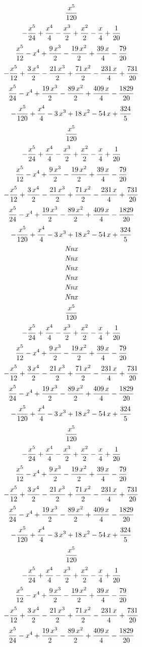 $${{x^5}\over{120}}$$
$$-{{x^5}\over{24}}+{{x^4}\over{4}}-{{x^3}\over{2}}+{{x^2}\over{2}}-
 {{x}\over{4}}+{{1}\over{20}}$$
$${{x^5}\over{12}}-x^4+{{9\,x^3}\over{2}}-{{19\,x^2}\over{2}}+{{39\,x
 }\over{4}}-{{79}\over{20}}$$
$$-{{x^5}\over{12}}+{{3\,x^4}\over{2}}-{{21\,x^3}\over{2}}+{{71\,x^2
 }\over{2}}-{{231\,x}\over{4}}+{{731}\over{20}}$$
$${{x^5}\over{24}}-x^4+{{19\,x^3}\over{2}}-{{89\,x^2}\over{2}}+{{409
 \,x}\over{4}}-{{1829}\over{20}}$$
$$-{{x^5}\over{120}}+{{x^4}\over{4}}-3\,x^3+18\,x^2-54\,x+{{324
 }\over{5}}$$
$${{x^5}\over{120}}$$
$$-{{x^5}\over{24}}+{{x^4}\over{4}}-{{x^3}\over{2}}+{{x^2}\over{2}}-
 {{x}\over{4}}+{{1}\over{20}}$$
$${{x^5}\over{12}}-x^4+{{9\,x^3}\over{2}}-{{19\,x^2}\over{2}}+{{39\,x
 }\over{4}}-{{79}\over{20}}$$
$$-{{x^5}\over{12}}+{{3\,x^4}\over{2}}-{{21\,x^3}\over{2}}+{{71\,x^2
 }\over{2}}-{{231\,x}\over{4}}+{{731}\over{20}}$$
$${{x^5}\over{24}}-x^4+{{19\,x^3}\over{2}}-{{89\,x^2}\over{2}}+{{409
 \,x}\over{4}}-{{1829}\over{20}}$$
$$-{{x^5}\over{120}}+{{x^4}\over{4}}-3\,x^3+18\,x^2-54\,x+{{324
 }\over{5}}$$
$${\it Nnx}$$
$${\it Nnx}$$
$${\it Nnx}$$
$${\it Nnx}$$
$${\it Nnx}$$
$${\it Nnx}$$
$${{x^5}\over{120}}$$
$$-{{x^5}\over{24}}+{{x^4}\over{4}}-{{x^3}\over{2}}+{{x^2}\over{2}}-
 {{x}\over{4}}+{{1}\over{20}}$$
$${{x^5}\over{12}}-x^4+{{9\,x^3}\over{2}}-{{19\,x^2}\over{2}}+{{39\,x
 }\over{4}}-{{79}\over{20}}$$
$$-{{x^5}\over{12}}+{{3\,x^4}\over{2}}-{{21\,x^3}\over{2}}+{{71\,x^2
 }\over{2}}-{{231\,x}\over{4}}+{{731}\over{20}}$$
$${{x^5}\over{24}}-x^4+{{19\,x^3}\over{2}}-{{89\,x^2}\over{2}}+{{409
 \,x}\over{4}}-{{1829}\over{20}}$$
$$-{{x^5}\over{120}}+{{x^4}\over{4}}-3\,x^3+18\,x^2-54\,x+{{324
 }\over{5}}$$
$${{x^5}\over{120}}$$
$$-{{x^5}\over{24}}+{{x^4}\over{4}}-{{x^3}\over{2}}+{{x^2}\over{2}}-
 {{x}\over{4}}+{{1}\over{20}}$$
$${{x^5}\over{12}}-x^4+{{9\,x^3}\over{2}}-{{19\,x^2}\over{2}}+{{39\,x
 }\over{4}}-{{79}\over{20}}$$
$$-{{x^5}\over{12}}+{{3\,x^4}\over{2}}-{{21\,x^3}\over{2}}+{{71\,x^2
 }\over{2}}-{{231\,x}\over{4}}+{{731}\over{20}}$$
$${{x^5}\over{24}}-x^4+{{19\,x^3}\over{2}}-{{89\,x^2}\over{2}}+{{409
 \,x}\over{4}}-{{1829}\over{20}}$$
$$-{{x^5}\over{120}}+{{x^4}\over{4}}-3\,x^3+18\,x^2-54\,x+{{324
 }\over{5}}$$
$${{x^5}\over{120}}$$
$$-{{x^5}\over{24}}+{{x^4}\over{4}}-{{x^3}\over{2}}+{{x^2}\over{2}}-
 {{x}\over{4}}+{{1}\over{20}}$$
$${{x^5}\over{12}}-x^4+{{9\,x^3}\over{2}}-{{19\,x^2}\over{2}}+{{39\,x
 }\over{4}}-{{79}\over{20}}$$
$$-{{x^5}\over{12}}+{{3\,x^4}\over{2}}-{{21\,x^3}\over{2}}+{{71\,x^2
 }\over{2}}-{{231\,x}\over{4}}+{{731}\over{20}}$$
$${{x^5}\over{24}}-x^4+{{19\,x^3}\over{2}}-{{89\,x^2}\over{2}}+{{409
 \,x}\over{4}}-{{1829}\over{20}}$$
